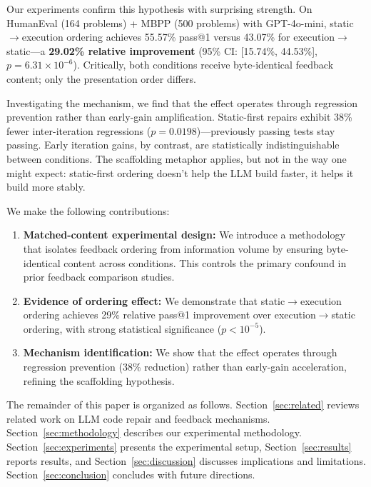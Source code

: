 Our experiments confirm this hypothesis with surprising strength. On HumanEval (164 problems) + MBPP (500 problems) with GPT-4o-mini, static$\rightarrow$execution ordering achieves 55.57\% pass@1 versus 43.07\% for execution$\rightarrow$static---a \textbf{29.02\% relative improvement} (95\% CI: [15.74\%, 44.53\%], $p=6.31\times10^{-6}$). Critically, both conditions receive byte-identical feedback content; only the presentation order differs.

Investigating the mechanism, we find that the effect operates through regression prevention rather than early-gain amplification. Static-first repairs exhibit 38\% fewer inter-iteration regressions ($p=0.0198$)---previously passing tests stay passing. Early iteration gains, by contrast, are statistically indistinguishable between conditions. The scaffolding metaphor applies, but not in the way one might expect: static-first ordering doesn't help the LLM build faster, it helps it build more stably.

We make the following contributions:

\begin{enumerate}
    \item \textbf{Matched-content experimental design:} We introduce a methodology that isolates feedback ordering from information volume by ensuring byte-identical content across conditions. This controls the primary confound in prior feedback comparison studies.

    \item \textbf{Evidence of ordering effect:} We demonstrate that static$\rightarrow$execution ordering achieves 29\% relative pass@1 improvement over execution$\rightarrow$static ordering, with strong statistical significance ($p<10^{-5}$).

    \item \textbf{Mechanism identification:} We show that the effect operates through regression prevention (38\% reduction) rather than early-gain acceleration, refining the scaffolding hypothesis.
\end{enumerate}

The remainder of this paper is organized as follows. Section~\ref{sec:related} reviews related work on LLM code repair and feedback mechanisms. Section~\ref{sec:methodology} describes our experimental methodology. Section~\ref{sec:experiments} presents the experimental setup, Section~\ref{sec:results} reports results, and Section~\ref{sec:discussion} discusses implications and limitations. Section~\ref{sec:conclusion} concludes with future directions.
